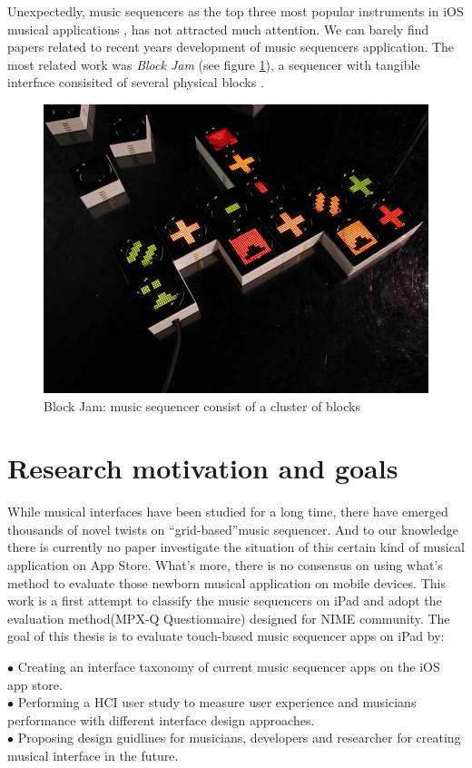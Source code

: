 Unexpectedly, music sequencers as the top three most popular instruments in iOS musical applications \citep{Reference14}, has not attracted much attention. We can barely find papers related to recent years development of music sequencers application. The most related work was \textit{Block Jam} (see figure \ref{fig: Block Jam}), a sequencer with tangible interface consisited of several physical blocks \citep{Reference20}.

\bigskip
\begin{figure}[h]
  \includegraphics[width=12 cm]{images/blockjam.jpg}
  \centering
  \caption{Block Jam: music sequencer consist of a cluster of blocks}
  \label{fig: Block Jam}
\end{figure}
\bigskip

\section{Research motivation and goals}

While musical interfaces have been studied for a long time, there have emerged thousands of novel twists on \textquotedblleft{grid-based}\textquotedblright music sequencer. And to our knowledge there is currently no paper investigate the situation of this certain kind of musical application on App Store. What's more, there is no consensus on using what's method to evaluate those newborn musical application on mobile devices. This work is a first attempt to classify the music sequencers on iPad and adopt the evaluation method(MPX-Q Questionnaire) designed for NIME community. The goal of this thesis is to evaluate touch-based music sequencer apps on iPad by:
\begin{flushleft}
$\bullet$ Creating an interface taxonomy of current music sequencer apps on the iOS app store.\\
$\bullet$ Performing a HCI user study to measure user experience and musicians performance with different interface design approaches.\\
$\bullet$ Proposing design guidlines for musicians, developers and researcher for creating musical interface in the future.
\end{flushleft}

